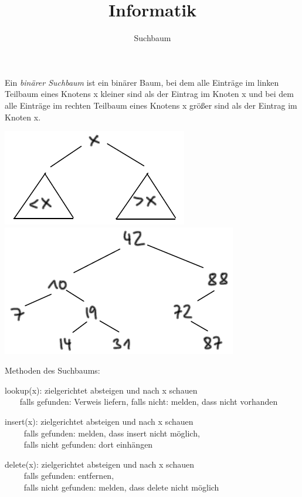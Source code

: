 \documentclass{beamer}
\begin{document}
\title{Informatik}   
\author{Suchbaum} 
\date{}
\frame{\titlepage} 

\begin{frame}[fragile]

Ein \textit{binärer Suchbaum}  ist ein binärer Baum, bei dem alle Einträge im linken
Teilbaum eines Knotens x kleiner sind als der Eintrag im Knoten x und bei
dem alle Einträge im rechten Teilbaum eines Knotens x größer sind als der
Eintrag im Knoten x. 

\includegraphics[scale=0.8]{suchbaum1.png} 
\includegraphics[scale=0.6]{suchbaum2.png} 
\end{frame}

\begin{frame}[fragile]

Methoden des Suchbaums:  

lookup(x): zielgerichtet absteigen und nach x schauen \\ 
~~~ falls gefunden: Verweis liefern,   falls nicht: melden, dass nicht vorhanden  

insert(x): zielgerichtet absteigen und nach x schauen \\ 
~~~~ falls gefunden: melden, dass insert nicht möglich, \\
~~~~  falls nicht gefunden: dort einhängen  

delete(x): zielgerichtet absteigen und nach x schauen  \\
~~~~ falls gefunden: entfernen, \\
~~~~ falls nicht gefunden: melden, dass delete nicht möglich

\end{frame}
\end{document}
